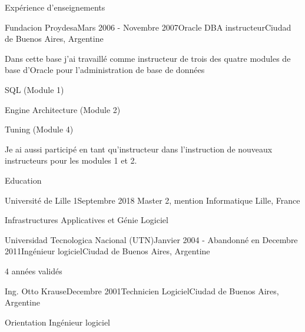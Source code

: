 \documentclass{resume} %
\begin{document}
\begin{rSection}{Exp\'{e}rience d'enseignements}
\begin{rSubsection}{Fundacion Proydesa}{Mars 2006 - Novembre 2007}{Oracle DBA instructeur}{Ciudad de Buenos Aires, Argentine}
	\item Dans cette base j'ai travaill\'{e} comme instructeur de trois des quatre modules de base d'Oracle pour l'administration de base de donn\'{e}es
	\item SQL (Module 1)
	\item Engine Architecture (Module 2)
	\item Tuning (Module 4)
	\item Je ai aussi particip\'{e} en tant qu'instructeur dans l'instruction de nouveaux instructeurs pour les modules 1 et 2.
\end{rSubsection}


\end{rSection}

\begin{rSection}{Education}

	\begin{rSubsection}{Université de Lille 1}{Septembre 2018 }{Master 2, mention Informatique }{Lille, France}
		\item	Infrastructures Applicatives et Génie Logiciel
	\end{rSubsection}
	\begin{rSubsection}{Universidad Tecnologica Nacional (UTN)}{Janvier 2004 - Abandonn\'{e} en Decembre 2011}{Ing\'{e}nieur logiciel}{Ciudad de Buenos Aires, Argentine}
		\item 4 années validés 
	\end{rSubsection}
	\begin{rSubsection}{Ing. Otto Krause}{Decembre 2001}{Technicien Logiciel}{Ciudad de Buenos Aires, Argentine}
		\item Orientation Ing\'{e}nieur logiciel
	\end{rSubsection}
\end{rSection}






\end{document}
